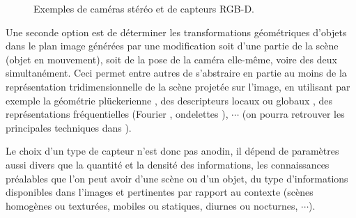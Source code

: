 \begin{figure}[!ht]
  \centering
\hfill
    \caption{\footnotesize{Exemples de cam\'eras st\'er\'eo et de capteurs RGB-D.}}
\label{chap01:fig02}
\end{figure}

Une seconde option est de d\'eterminer les transformations g\'eom\'etriques d'objets dans le plan image g\'en\'er\'ees par une modification soit d'une partie de la sc\`ene (objet en mouvement), soit de la pose de la cam\'era elle-m\^eme, voire des deux simultan\'ement. Ceci permet entre autres de s'abstraire en partie au moins de la repr\'esentation tridimensionnelle de la sc\`ene projet\'ee sur l'image, en utilisant par exemple la g\'eom\'etrie pl\"uckerienne \cite{andreff:inria-00072393}, des descripteurs locaux ou globaux \cite{latuan2010}, des repr\'esentations fr\'equentielles (Fourier \cite{chari2008}, ondelettes \cite{ramosvelasco2012}), $\cdots$ (on pourra retrouver les principales techniques dans \cite{marchand2005}).

Le choix d'un type de capteur n'est donc pas anodin, il d\'epend de param\`etres aussi divers que la quantit\'e et la densit\'e des informations, les connaissances pr\'ealables que l'on peut avoir d'une sc\`ene ou d'un objet, du type d'informations disponibles dans l'images et pertinentes par rapport au contexte (sc\`enes homog\`enes ou textur\'ees, mobiles ou statiques, diurnes ou nocturnes, $\cdots$).

